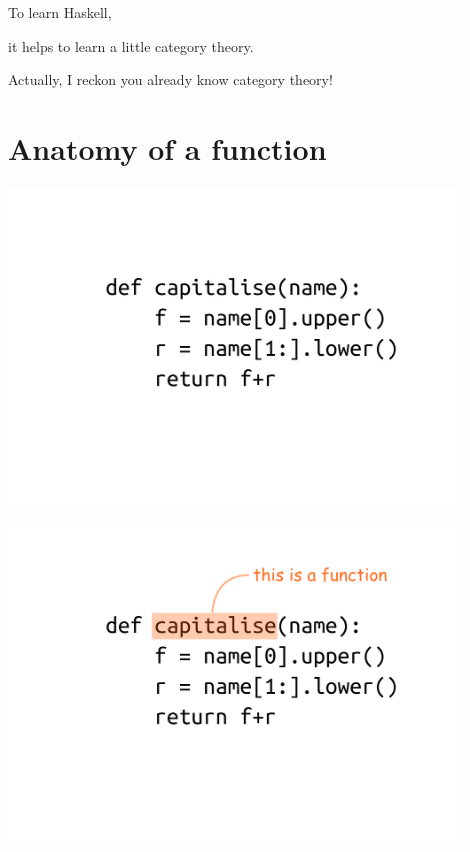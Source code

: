 \documentclass[xcolor={table}]{beamer}
\begin{document}
\begin{frame}{}{}

    \centering
    {\Large To learn Haskell, \par it helps to learn a little category theory. }
    \par\bigskip\pause

    Actually, I reckon you already know category theory!


\end{frame}

\section{Anatomy of a function}

\begin{frame}{}{}

    \centering
    \includegraphics[width=0.9\textwidth]{images/python-code-01.png}

\end{frame}

\begin{frame}{}{}

    \centering
    \includegraphics[width=0.9\textwidth]{images/python-code-02.png}

\end{frame}
\end{document}
